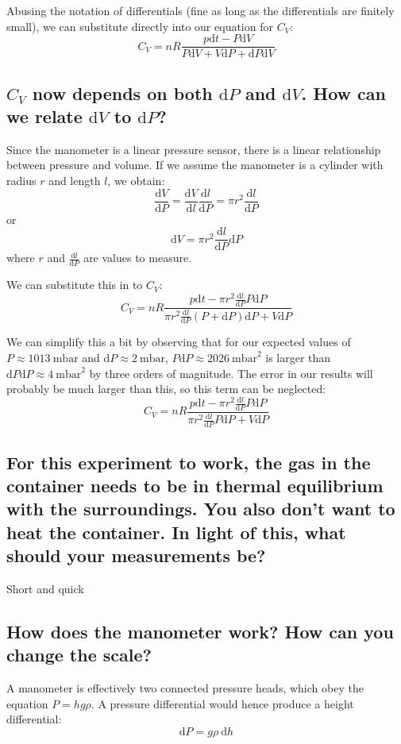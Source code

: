 \documentclass[a4paper]{scrartcl}
\begin{document}
Abusing the notation of differentials (fine as long as the differentials are finitely small), we can substitute directly into our equation for \(C_V\):
\[C_V = n R \frac{p \mathrm{d} t - P \mathrm{d} V}{P \mathrm{d} V + V \mathrm{d} P + \mathrm{d} P \mathrm{d} V}\]

\subsection{\(C_V\) now depends on both \(\mathrm{d} P\) and \(\mathrm{d} V\). How can we relate \(\mathrm{d} V\) to \(\mathrm{d} P\)?}
Since the manometer is a linear pressure sensor, there is a linear relationship between pressure and volume. If we assume the manometer is a cylinder with radius \(r\) and length \(l\), we obtain:
\[\frac{\mathrm{d} V}{\mathrm{d} P} = \frac{\mathrm{d} V}{\mathrm{d} l} \frac{\mathrm{d} l}{\mathrm{d} P} = \pi r^2 \frac{\mathrm{d} l}{\mathrm{d} P}\]
or
\[\mathrm{d} V = \pi r^2 \frac{\mathrm{d} l}{\mathrm{d} P} \mathrm{d} P\]
where \(r\) and \(\frac{\mathrm{d} l}{\mathrm{d} P}\) are values to measure.

We can substitute this in to \(C_V\):
\[C_V = n R \frac{p \mathrm{d} t - \pi r^2 \frac{\mathrm{d} l}{\mathrm{d} P} P \mathrm{d} P}{\pi r^2 \frac{\mathrm{d} l}{\mathrm{d} P} (P + \mathrm{d} P) \mathrm{d} P + V \mathrm{d} P}\]

We can simplify this a bit by observing that for our expected values of \(P \approx \SI{1013}{\milli\bar}\) and \(\mathrm{d} P \approx \SI{2}{\milli\bar}\), \(P \mathrm{d} P \approx \SI{2026}{\milli\bar\squared}\) is larger than \(\mathrm{d} P \mathrm{d} P \approx \SI{4}{\milli\bar\squared}\) by three orders of magnitude. The error in our results will probably be much larger than this, so this term can be neglected:
\[C_V = n R \frac{p \mathrm{d} t - \pi r^2 \frac{\mathrm{d} l}{\mathrm{d} P} P \mathrm{d} P}{\pi r^2 \frac{\mathrm{d} l}{\mathrm{d} P} P \mathrm{d} P + V \mathrm{d} P}\]

\subsection{For this experiment to work, the gas in the container needs to be in thermal equilibrium with the surroundings. You also don't want to heat the container. In light of this, what should your measurements be?}
Short and quick

\subsection{How does the manometer work? How can you change the scale?}
A manometer is effectively two connected pressure heads, which obey the equation \(P = h g \rho\). A pressure differential would hence produce a height differential:
\[\mathrm{d} P = g \rho \:\mathrm{d} h\]
\end{document}
